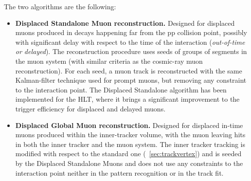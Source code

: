The two algorithms are the following:
\begin{itemize}
\setlength\itemsep{-0.2em}
\item \textbf{Displaced Standalone Muon reconstruction.} Designed for
  displaced muons produced in decays happening far from the pp
  collision point, possibly with significant delay with respect to the time of the
  interaction (\emph{out-of-time or delayed}). The reconstruction
  procedure uses seeds of groups of segments in the muon system
  (with similar criteria as the cosmic-ray muon reconstruction). For
  each seed, a muon track is reconstructed with the same Kalman-filter
  technique used for prompt muons, but removing any constraint to the
  interaction point. The Displaced Standalone algorithm has been implemented for the HLT,
  where it brings a significant improvement to the trigger efficiency for displaced and delayed
  muons.
\item \textbf{Displaced Global Muon reconstruction.} Designed for displaced in-time muons produced within the inner-tracker volume, with the
  muon leaving hits in both the inner tracker and the muon system. The
  inner tracker tracking is modified with respect to the standard one
  (~\ref{sec:trackvertex}) and is seeded by the Displaced Standalone Muons and does
  not use any constraints to the interaction point neither in the pattern recognition or in the track fit.
\end{itemize}

